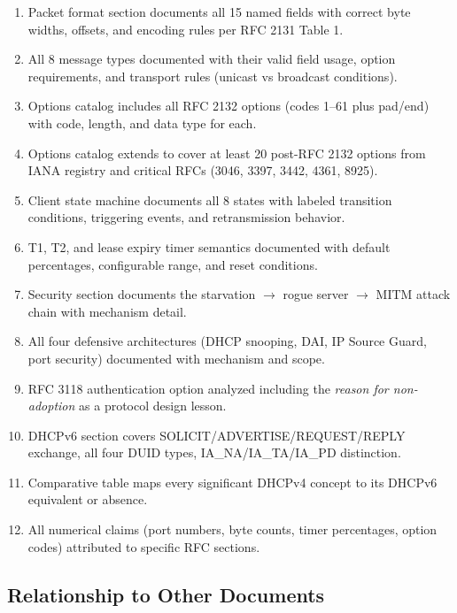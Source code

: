 \documentclass[11pt,letterpaper]{article}
\begin{document}
\begin{enumerate}
  \item Packet format section documents all 15 named fields with correct byte widths, offsets, and encoding rules per RFC 2131 Table 1.
  \item All 8 message types documented with their valid field usage, option requirements, and transport rules (unicast vs broadcast conditions).
  \item Options catalog includes all RFC 2132 options (codes 1--61 plus pad/end) with code, length, and data type for each.
  \item Options catalog extends to cover at least 20 post-RFC 2132 options from IANA registry and critical RFCs (3046, 3397, 3442, 4361, 8925).
  \item Client state machine documents all 8 states with labeled transition conditions, triggering events, and retransmission behavior.
  \item T1, T2, and lease expiry timer semantics documented with default percentages, configurable range, and reset conditions.
  \item Security section documents the starvation $\to$ rogue server $\to$ MITM attack chain with mechanism detail.
  \item All four defensive architectures (DHCP snooping, DAI, IP Source Guard, port security) documented with mechanism and scope.
  \item RFC 3118 authentication option analyzed including the \textit{reason for non-adoption} as a protocol design lesson.
  \item DHCPv6 section covers SOLICIT/ADVERTISE/REQUEST/REPLY exchange, all four DUID types, IA\_NA/IA\_TA/IA\_PD distinction.
  \item Comparative table maps every significant DHCPv4 concept to its DHCPv6 equivalent or absence.
  \item All numerical claims (port numbers, byte counts, timer percentages, option codes) attributed to specific RFC sections.
\end{enumerate}

\subsection{Relationship to Other Documents}
\end{document}

